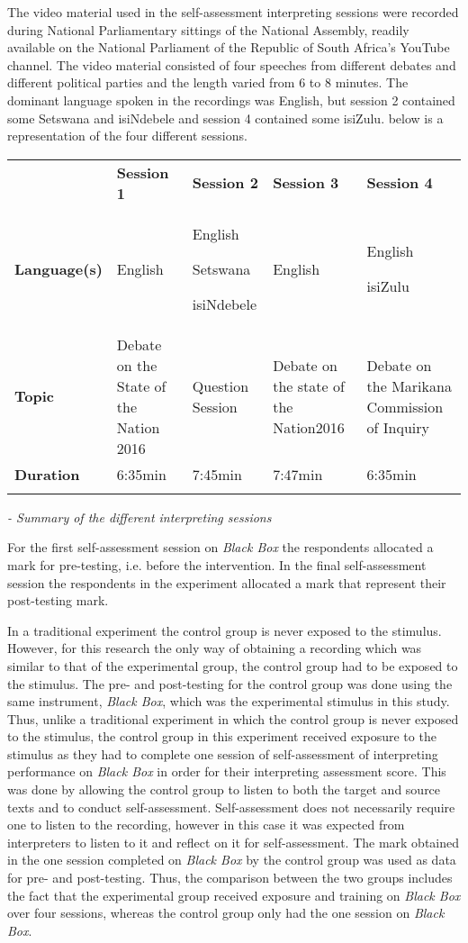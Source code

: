 \documentclass[output=paper]{langsci/langscibook}
\begin{document}
The video material used in the self-assessment interpreting sessions were recorded during National Parliamentary sittings of the National Assembly, readily available on the National Parliament of the Republic of South Africa’s YouTube channel. The video material consisted of four speeches from different debates and different political parties and the length varied from 6 to 8 minutes. The dominant language spoken in the recordings was English, but session 2 contained some Setswana and isiNdebele and session 4 contained some isiZulu.  below is a representation of the four different sessions.


\begin{tabularx}{\textwidth}{XXXXX} & \textbf{Session 1} & \textbf{Session 2} & \textbf{Session 3} & \textbf{Session 4}\\
\lsptoprule
\textbf{Language(s)} & English & English

Setswana

isiNdebele & English & English

isiZulu\\
\textbf{Topic} & Debate on the State of the Nation 2016 & Question Session & Debate on the state of the Nation2016 & Debate on the Marikana Commission of Inquiry\\
\textbf{Duration} & 6:35min & 7:45min & 7:47min & 6:35min\\
\lspbottomrule
\end{tabularx}
\textit{- Summary of the different interpreting sessions}

For the first self-assessment session on \textit{Black Box} the respondents allocated a mark for pre-testing, i.e. before the intervention. In the final self-assessment session the respondents in the experiment allocated a mark that represent their post-testing mark. 

In a traditional experiment the control group is never exposed to the stimulus. However, for this research the only way of obtaining a recording which was similar to that of the experimental group, the control group had to be exposed to the stimulus. The pre- and post-testing for the control group was done using the same instrument, \textit{Black Box}, which was the experimental stimulus in this study. Thus, unlike a traditional experiment in which the control group is never exposed to the stimulus, the control group in this experiment received exposure to the stimulus as they had to complete one session of self-assessment of interpreting performance on \textit{Black Box} in order for their interpreting assessment score. This was done by allowing the control group to listen to both the target and source texts and to conduct self-assessment. Self-assessment does not necessarily require one to listen to the recording, however in this case it was expected from interpreters to listen to it and reflect on it for self-assessment. The mark obtained in the one session completed on \textit{Black Box} by the control group was used as data for pre- and post-testing. Thus, the comparison between the two groups includes the fact that the experimental group received exposure and training on \textit{Black Box} over four sessions, whereas the control group only had the one session on \textit{Black Box}.
\end{document}
